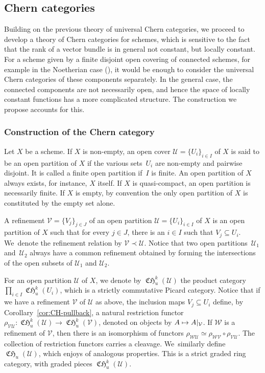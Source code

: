 \documentclass[JEP,XML,SOM,Unicode,published]{cedram}
\newcommand\mto{\mathchoice{\longmapsto}{\mapsto}{\mapsto}{\mapsto}}
\theoremstyle{plain}
\theoremstyle{definition}
\newcommand{\Ucal}{\mathcal U}
\newcommand{\Vcal}{\mathcal V}
\newcommand{\Wcal}{\mathcal W}
\DeclareMathOperator{\CHfrak}{\mathfrak{CH}}
\begin{document}
\subsection{Chern categories}\label{subsec:Chern-category-quasi-compact}
Building on the previous theory of universal Chern categories, we proceed to develop a theory of Chern categories for schemes, which is sensitive to the fact that the rank of a vector bundle is in general not constant, but locally constant. For a scheme given by a finite disjoint open covering of connected schemes, for example in the Noetherian case (\cf \cite[\href{https://stacks.math.columbia.edu/tag/04MF}{04MF}]{stacks-project}), it would be enough to consider the universal Chern categories of these components separately. In the general case, the connected components are not necessarily open, and hence the space of locally constant functions has a more complicated structure. The construction we propose accounts for this.

\subsubsection{Construction of the Chern category}
Let $X$ be a scheme. If $X$ is non-empty, an open cover $\Ucal=\lbrace U_{i}\rbrace_{i\in I}$ of $X$ is said to be an open partition of $X$ if the various sets~$U_i$ are non-empty and pairwise disjoint. It is called a finite open partition if~$I$ is finite. An open partition of $X$ always exists, for instance, $X$ itself. If $X$ is quasi-compact, an open partition is necessarily finite. If $X$ is empty, by convention the only open partition of $X$ is constituted by the empty set alone.

A refinement $\Vcal=\lbrace V_{j}\rbrace_{j\in J}$ of an open partition $\Ucal=\lbrace U_{i}\rbrace_{i\in I}$ of $X$ is an open partition of $X$ such that for every $j \in J$, there is an $i \in I$ such that $V_j \subseteq U_i$. We~denote the refinement relation by $\Vcal\prec\Ucal$. Notice that two open partitions~$\Ucal_{1}$ and~$\Ucal_{2}$ always have a common refinement obtained by forming the intersections of the open subsets of $\Ucal_{1}$ and $\Ucal_{2}$.

For an open partition $\Ucal$ of $X$, we denote by $\CHfrak_{u}^{k}(\Ucal)$ the product category $\prod_{i\in I}\CHfrak_u^{k}(U_{i})$, which is a strictly commutative Picard category. Notice that if we have a refinement $\Vcal$ of $\Ucal$ as above, the inclusion maps $V_j \subseteq U_i$ define, by Corollary~\ref{cor:CH-pullback}, a natural restriction functor $\rho_{\Vcal\Ucal}\colon \CHfrak_{u}^{k}(\Ucal) \to \CHfrak_{u}^{k}(\Vcal)$, denoted on objects by $A\mto A|_{\Vcal}$. If $\Wcal$ is a refinement of $\Vcal$, then there is an isomorphism of functors $\rho_{\Wcal\Ucal}\simeq\rho_{\Wcal\Vcal}\circ\rho_{\Vcal\Ucal}$. The collection of restriction functors carries a cleavage. We~similarly define $\CHfrak_{u}(\Ucal)$, which enjoys of analogous properties. This is a strict graded ring category, with graded pieces $\CHfrak^{k}_{u}(\Ucal)$.
\end{document}
